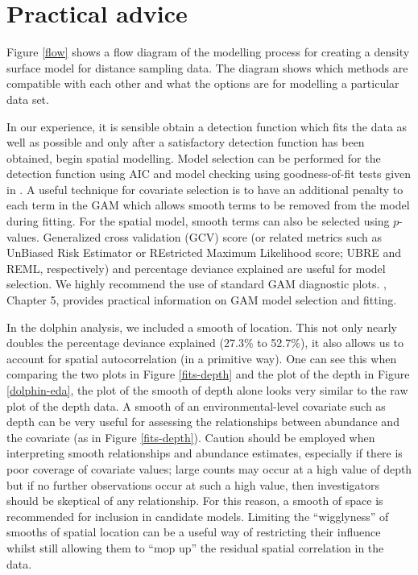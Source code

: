 \documentclass[a4paper,12pt]{article}
\begin{document}
\section*{Practical advice}
\label{s:practical}

Figure \ref{flow} shows a flow diagram of the modelling process for creating a density surface model for distance sampling data. The diagram shows which methods are compatible with each other and what the options are for modelling a particular data set.

In our experience, it is sensible obtain a detection function which fits the data as well as possible and only after a satisfactory detection function has been obtained, begin spatial modelling. Model selection can be performed for the detection function using AIC and model checking using goodness-of-fit tests given in \cite{Buckland:2004ts}.  A useful technique for covariate selection is to have an additional penalty to each term in the GAM which allows smooth terms to be removed from the model during fitting. For the spatial model, smooth terms can also be selected using $p$-values. Generalized cross validation (GCV) score (or related metrics such as UnBiased Risk Estimator or REstricted Maximum Likelihood score; UBRE and REML, respectively) and percentage deviance explained are useful for model selection. We highly recommend the use of standard GAM diagnostic plots. \cite{Wood:2006wz}, Chapter 5, provides practical information on GAM model selection and fitting.

In the dolphin analysis, we included a smooth of location. This not only nearly doubles the percentage deviance explained (27.3\% to 52.7\%), it also allows us to account for spatial autocorrelation (in a primitive way). One can see this when comparing the two plots in Figure \ref{fits-depth} and the plot of the depth in Figure \ref{dolphin-eda}, the plot of the smooth of depth alone looks very similar to the raw plot of the depth data. A smooth of an environmental-level covariate such as depth can be very useful for assessing the relationships between abundance and the covariate (as in Figure \ref{fits-depth}). Caution should be employed when interpreting smooth relationships and abundance estimates, especially if there is poor coverage of covariate values; large counts may occur at a high value of depth but if no further observations occur at such a high value, then investigators should be skeptical of any relationship. For this reason, a smooth of space is recommended for inclusion in candidate models. Limiting the ``wigglyness'' of smooths of spatial location can be a useful way of restricting their influence whilst still allowing them to ``mop up'' the residual spatial correlation in the data.
\end{document}
